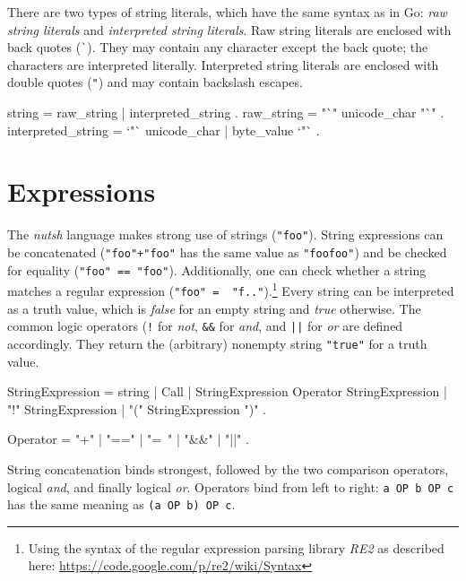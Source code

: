 \documentclass[paper=a4,twoside,abstract=on,cleardoublepage=empty,numbers=noenddot,toc=bib,11pt,appendixprefix=true]{scrreprt}
\begin{document}

There are two types of string literals, which have the same syntax as in Go: \emph{raw string literals} and \emph{interpreted string literals}. Raw string literals are enclosed with back quotes (\texttt{\`}). They may contain any character except the back quote; the characters are interpreted literally. Interpreted string literals are enclosed with double quotes (\texttt{"}) and may contain backslash escapes.

\begin{ebnf}
string = raw_string | interpreted_string .
raw_string = "`" { unicode_char } "`" .
interpreted_string = `"` { unicode_char | byte_value } `"` .
\end{ebnf}

\section{Expressions}


The \emph{nutsh} language makes strong use of strings (\texttt{"foo"}). String expressions can be concatenated (\texttt{"foo"+"foo"} has the same value as \texttt{"foofoo"}) and be checked for equality (\texttt{"foo" == "foo"}). Additionally, one can check whether a string matches a regular expression (\texttt{"foo" =~ "f.."}).\footnote{Using the syntax of the regular expression parsing library \emph{RE2} as described here: \url{https://code.google.com/p/re2/wiki/Syntax}} Every string can be interpreted as a truth value, which is \emph{false} for an empty string and \emph{true} otherwise. The common logic operators (\texttt{!} for \emph{not}, \texttt{\&\&} for \emph{and}, and \texttt{||} for \emph{or} are defined accordingly. They return the (arbitrary) nonempty string \texttt{"true"} for a truth value.

\begin{ebnf}
StringExpression =
        string | Call | StringExpression Operator StringExpression |
        "!" StringExpression | "(" StringExpression ")" .

Operator = "+" | "==" | "=~" | "&&" | "||" .
\end{ebnf}


String concatenation binds strongest, followed by the two comparison operators, logical \emph{and}, and finally logical \emph{or}. Operators bind from left to right: \texttt{a OP b OP c} has the same meaning as \texttt{(a OP b) OP c}.
\end{document}
